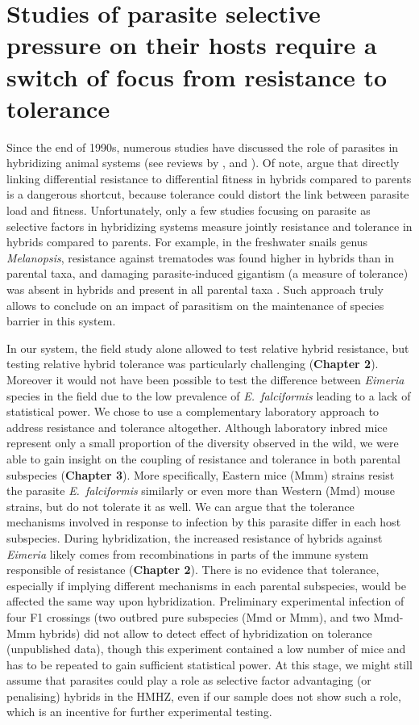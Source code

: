 \section{Studies of parasite selective pressure on their hosts require a switch of focus from resistance to tolerance}
Since the end of 1990s, numerous studies have discussed the role of parasites in hybridizing animal systems (see reviews by \cite{fritz_resistance_1999}, \cite{karvonen_role_2012} and \cite{theodosopoulos_parasites_2019}). Of note, \cite{baird_shifting_2019} argue that directly linking differential resistance to differential fitness in hybrids compared to parents is a dangerous shortcut, because tolerance could distort the link between parasite load and fitness. Unfortunately, only a few studies focusing on parasite as selective factors in hybridizing systems measure jointly resistance and tolerance in hybrids compared to parents. For example, in the freshwater snails genus \textit{Melanopsis}, resistance against trematodes was found higher in hybrids than in parental taxa, and damaging parasite-induced gigantism (a measure of tolerance) was absent in hybrids and present in all parental taxa \citep{guttel_maintenance_2014}. Such approach truly allows to conclude on an impact of parasitism on the maintenance of species barrier in this system. 
\par
In our system, the field study alone allowed to test relative hybrid resistance, but testing relative hybrid tolerance was particularly challenging (\textbf{Chapter 2}). Moreover it would not have been possible to test the difference between \textit{Eimeria} species in the field due to the low prevalence of \textit{E.~falciformis} leading to a lack of statistical power. We chose to use a complementary laboratory approach to address resistance and tolerance altogether. Although laboratory inbred mice represent only a small proportion of the diversity observed in the wild, we were able to gain insight on the coupling of resistance and tolerance in both parental subspecies (\textbf{Chapter 3}). More specifically, Eastern mice (Mmm) strains resist the parasite \textit{E.~falciformis} similarly or even more than Western (Mmd) mouse strains, but do not tolerate it as well. We can argue that the tolerance mechanisms involved in response to infection by this parasite differ in each host subspecies. During hybridization, the increased resistance of hybrids against \textit{Eimeria} likely comes from recombinations in parts of the immune system responsible of resistance (\textbf{Chapter 2}). There is no evidence that tolerance, especially if implying different mechanisms in each parental subspecies, would be affected the same way upon hybridization. Preliminary experimental infection of four F1 crossings (two outbred pure subspecies (Mmd or Mmm), and two Mmd-Mmm hybrids) did not allow to detect effect of hybridization on tolerance (unpublished data), though this experiment contained a low number of mice and has to be repeated to gain sufficient statistical power. At this stage, we might still assume that parasites could play a role as selective factor advantaging (or penalising) hybrids in the HMHZ, even if our sample does not show such a role, which is an incentive for further experimental testing.

